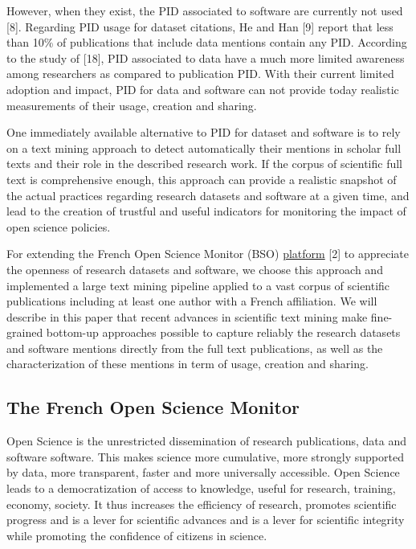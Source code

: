 \documentclass[
]{article}
\begin{document}
However, when they exist, the PID associated to software are currently
not used {[}8{]}. Regarding PID usage for dataset citations, He and Han
{[}9{]} report that less than 10\% of publications that include data
mentions contain any PID. According to the study of {[}18{]}, PID
associated to data have a much more limited awareness among researchers
as compared to publication PID. With their current limited adoption and
impact, PID for data and software can not provide today realistic
measurements of their usage, creation and sharing.

One immediately available alternative to PID for dataset and software is
to rely on a text mining approach to detect automatically their mentions
in scholar full texts and their role in the described research work. If
the corpus of scientific full text is comprehensive enough, this
approach can provide a realistic snapshot of the actual practices
regarding research datasets and software at a given time, and lead to
the creation of trustful and useful indicators for monitoring the impact
of open science policies.

For extending the French Open Science Monitor (BSO)
\href{https://frenchopensciencemonitor.esr.gouv.fr}{platform} {[}2{]} to
appreciate the openness of research datasets and software, we choose
this approach and implemented a large text mining pipeline applied to a
vast corpus of scientific publications including at least one author
with a French affiliation. We will describe in this paper that recent
advances in scientific text mining make fine-grained bottom-up
approaches possible to capture reliably the research datasets and
software mentions directly from the full text publications, as well as
the characterization of these mentions in term of usage, creation and
sharing.

\hypertarget{the-french-open-science-monitor}{%
\subsection{The French Open Science
Monitor}\label{the-french-open-science-monitor}}

Open Science is the unrestricted dissemination of research publications,
data and software software. This makes science more cumulative, more
strongly supported by data, more transparent, faster and more
universally accessible. Open Science leads to a democratization of
access to knowledge, useful for research, training, economy, society. It
thus increases the efficiency of research, promotes scientific progress
and is a lever for scientific advances and is a lever for scientific
integrity while promoting the confidence of citizens in science.
\end{document}

